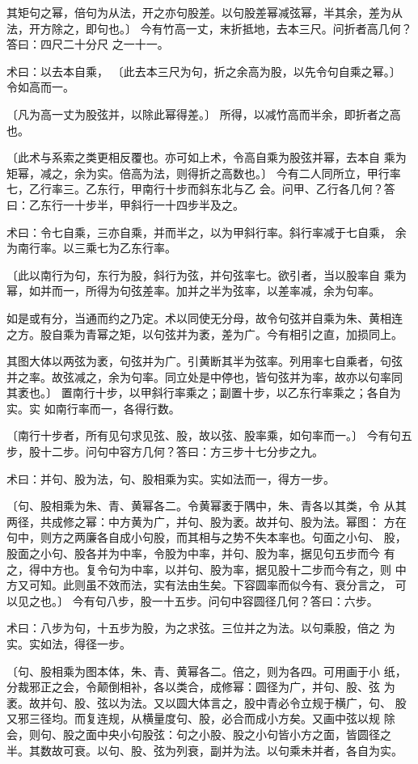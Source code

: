 \documentclass[a4paper,12pt,UTF8,twoside]{ctexbook}
\begin{document}
其矩句之幂，倍句为从法，开之亦句股差。以句股差幂减弦幂，半其余，差为从 法，开方除之，即句也。〕 今有竹高一丈，末折抵地，去本三尺。问折者高几何？答曰：四尺二十分尺 之一十一。

术曰：以去本自乘， 〔此去本三尺为句，折之余高为股，以先令句自乘之幂。〕 令如高而一。

〔凡为高一丈为股弦并，以除此幂得差。〕 所得，以减竹高而半余，即折者之高也。

〔此术与系索之类更相反覆也。亦可如上术，令高自乘为股弦并幂，去本自 乘为矩幂，减之，余为实。倍高为法，则得折之高数也。〕 今有二人同所立，甲行率七，乙行率三。乙东行，甲南行十步而斜东北与乙 会。问甲、乙行各几何？答曰：乙东行一十步半，甲斜行一十四步半及之。

术曰：令七自乘，三亦自乘，并而半之，以为甲斜行率。斜行率减于七自乘， 余为南行率。以三乘七为乙东行率。

〔此以南行为句，东行为股，斜行为弦，并句弦率七。欲引者，当以股率自 乘为幂，如并而一，所得为句弦差率。加并之半为弦率，以差率减，余为句率。

如是或有分，当通而约之乃定。术以同使无分母，故令句弦并自乘为朱、黄相连 之方。股自乘为青幂之矩，以句弦并为袤，差为广。今有相引之直，加损同上。

其图大体以两弦为袤，句弦并为广。引黄断其半为弦率。列用率七自乘者，句弦 并之率。故弦减之，余为句率。同立处是中停也，皆句弦并为率，故亦以句率同 其袤也。〕 置南行十步，以甲斜行率乘之；副置十步，以乙东行率乘之；各自为实。实 如南行率而一，各得行数。

〔南行十步者，所有见句求见弦、股，故以弦、股率乘，如句率而一。〕 今有句五步，股十二步。问句中容方几何？答曰：方三步十七分步之九。

术曰：并句、股为法，句、股相乘为实。实如法而一，得方一步。

〔句、股相乘为朱、青、黄幂各二。令黄幂袤于隅中，朱、青各以其类，令 从其两径，共成修之幂：中方黄为广，并句、股为袤。故并句、股为法。幂图： 方在句中，则方之两廉各自成小句股，而其相与之势不失本率也。句面之小句、 股，股面之小句、股各并为中率，令股为中率，并句、股为率，据见句五步而今 有之，得中方也。复令句为中率，以并句、股为率，据见股十二步而今有之，则 中方又可知。此则虽不效而法，实有法由生矣。下容圆率而似今有、衰分言之， 可以见之也。〕 今有句八步，股一十五步。问句中容圆径几何？答曰：六步。

术曰：八步为句，十五步为股，为之求弦。三位并之为法。以句乘股，倍之 为实。实如法，得径一步。

〔句、股相乘为图本体，朱、青、黄幂各二。倍之，则为各四。可用画于小 纸，分裁邪正之会，令颠倒相补，各以类合，成修幂：圆径为广，并句、股、弦 为袤。故并句、股、弦以为法。又以圆大体言之，股中青必令立规于横广，句、 股又邪三径均。而复连规，从横量度句、股，必合而成小方矣。又画中弦以规 除会，则句、股之面中央小句股弦：句之小股、股之小句皆小方之面，皆圆径之 半。其数故可衰。以句、股、弦为列衰，副并为法。以句乘未并者，各自为实。
\end{document}
